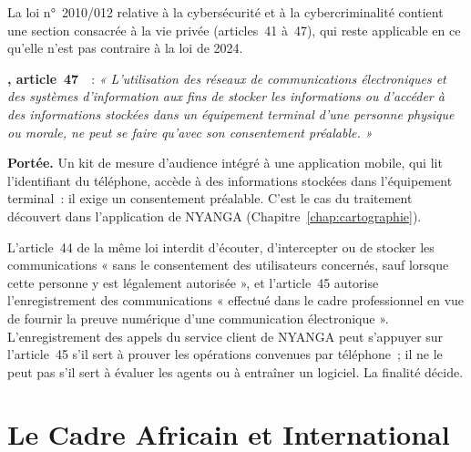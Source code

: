La loi n°~2010/012 relative à la cybersécurité et à la cybercriminalité
contient une section consacrée à la vie privée (articles~41 à~47), qui
reste applicable en ce qu'elle n'est pas contraire à la loi de 2024.

\begin{boxjuris}
\textbf{, article~47}~\cite{loi2010012}~:
\textit{« L'utilisation des réseaux de communications électroniques et des
systèmes d'information aux fins de stocker les informations ou d'accéder à
des informations stockées dans un équipement terminal d'une personne
physique ou morale, ne peut se faire qu'avec son consentement
préalable. »}

\smallskip
\textbf{Portée.} Un kit de mesure d'audience intégré à une application
mobile, qui lit l'identifiant du téléphone, accède à des informations
stockées dans l'équipement terminal~: il exige un consentement préalable.
C'est le cas du traitement découvert dans l'application de NYANGA
(Chapitre~\ref{chap:cartographie}).
\end{boxjuris}

L'article~44 de la même loi interdit d'écouter, d'intercepter ou de stocker
les communications « sans le consentement des utilisateurs concernés, sauf
lorsque cette personne y est légalement autorisée », et l'article~45
autorise l'enregistrement des communications « effectué dans le cadre
professionnel en vue de fournir la preuve numérique d'une communication
électronique ». L'enregistrement des appels du service client de NYANGA
peut s'appuyer sur l'article~45 s'il sert à prouver les opérations
convenues par téléphone~; il ne le peut pas s'il sert à évaluer les agents
ou à entraîner un logiciel. La finalité décide.

\section{Le Cadre Africain et International}
\label{sec:c08-international}

